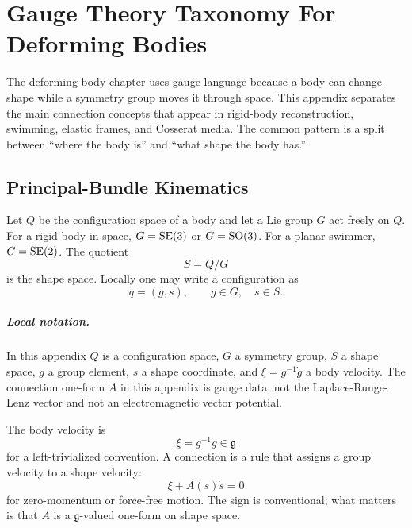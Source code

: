 \chapter{Gauge Theory Taxonomy For Deforming Bodies}
\label{app:gauge-taxonomy}

The deforming-body chapter uses gauge language because a body can change shape
while a symmetry group moves it through space.  This appendix separates the
main connection concepts that appear in rigid-body reconstruction, swimming,
elastic frames, and Cosserat media.  The common pattern is a split between
``where the body is'' and ``what shape the body has.''

\section{Principal-Bundle Kinematics}
\label{sec:gauge-principal-bundle-kinematics}

Let \(Q\) be the configuration space of a body and let a Lie group \(G\) act
freely on \(Q\).  For a rigid body in space, \(G=\operatorname{SE}(3)\) or \(G=\operatorname{SO}(3)\).
For a planar swimmer, \(G=\operatorname{SE}(2)\).  The quotient
\[
        S=Q/G
\]
is the shape space.  Locally one may write a configuration as
\[
        q=(g,s),\qquad g\in G,\quad s\in S.
\]

\paragraph{Local notation.}
In this appendix \(Q\) is a configuration space, \(G\) a symmetry group,
\(S\) a shape space, \(g\) a group element, \(s\) a shape coordinate, and
\(\xi=g^{-1}\dot g\) a body velocity.  The connection one-form \(A\) in this
appendix is gauge data, not the Laplace-Runge-Lenz vector and not an
electromagnetic vector potential.

The body velocity is
\[
        \xi=g^{-1}\dot g\in\mathfrak{g}
\]
for a left-trivialized convention.  A connection is a rule that assigns a
group velocity to a shape velocity:
\[
        \xi + A(s)\dot s =0
\]
for zero-momentum or force-free motion.  The sign is conventional; what matters
is that \(A\) is a \(\mathfrak{g}\)-valued one-form on shape space.

